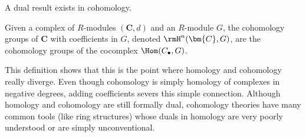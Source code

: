 A dual result exists in cohomology. 

\begin{defn}
    Given a complex of $R$-modules $(\bm{C},d)$ and an $R$-module $G$, the cohomology groups of $\bm{C}$ with coefficients in $G$, denoted $\rmH^n(\bm{C},G)$, are the cohomology groups of the cocomplex $\Hom(C_\bullet,G)$.
\end{defn}

This definition shows that this is the point where homology and cohomology really diverge. Even though cohomology is simply homology of complexes in negative degrees, adding coefficients severs this simple connection. Although homology and cohomology are still formally dual, cohomology theories have many common tools (like ring structures) whose duals in homology are very poorly understood or are simply unconventional.

